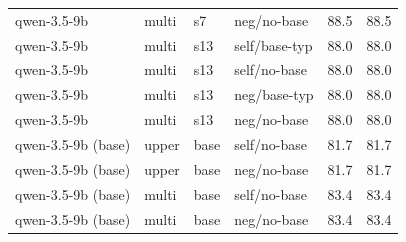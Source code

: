 {\begin{longtable}{llll rr}
qwen-3.5-9b & multi & s7 & neg/no-base & 88.5 & 88.5 \\
qwen-3.5-9b & multi & s13 & self/base-typ & 88.0 & 88.0 \\
qwen-3.5-9b & multi & s13 & self/no-base & 88.0 & 88.0 \\
qwen-3.5-9b & multi & s13 & neg/base-typ & 88.0 & 88.0 \\
qwen-3.5-9b & multi & s13 & neg/no-base & 88.0 & 88.0 \\
\midrule
qwen-3.5-9b (base) & upper & base & self/no-base & 81.7 & 81.7 \\
qwen-3.5-9b (base) & upper & base & neg/no-base & 81.7 & 81.7 \\
\midrule
qwen-3.5-9b (base) & multi & base & self/no-base & 83.4 & 83.4 \\
qwen-3.5-9b (base) & multi & base & neg/no-base & 83.4 & 83.4 \\
\bottomrule
\end{longtable}
}
